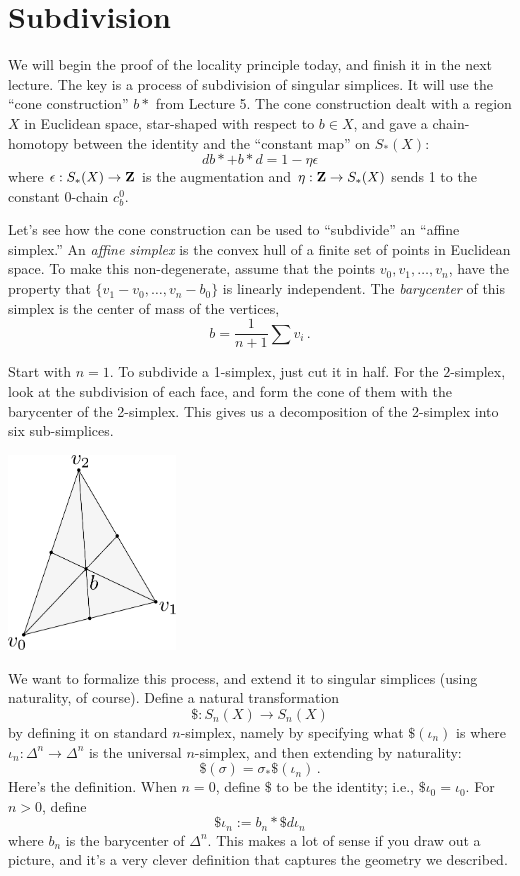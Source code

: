 \section{Subdivision}

We will begin the proof of the locality principle today, 
and finish it in the next lecture.
The key is a process of subdivision of singular simplices. It will use the 
``cone construction'' $b*$ from Lecture 5. The cone construction 
dealt with a region $X$ 
in Euclidean space, star-shaped with respect to $b\in X$, and gave a 
chain-homotopy between the identity and the ``constant map'' on $S_*(X)$:
\[
db*+b*d=1-\eta\epsilon
\]
where $\epsilon:S_*(X)\to\mathbf Z$ is the augmentation and $\eta:\mathbf Z\to S_*(X)$
sends 1 to the constant 0-chain $c_b^0$. 

Let's see how the cone construction can be used to ``subdivide'' an ``affine 
simplex.'' An {\em affine simplex} is the convex hull of a finite set of points in Euclidean space. To make this non-degenerate, assume that the points $v_0,v_1,\ldots,v_n$, have the property that $\{v_1-v_0,\ldots,v_n-b_0\}$ is linearly independent. 
The {\em barycenter} of this simplex is the center of mass of the vertices, 
\[
b=\frac{1}{n+1}\sum{v_i}\,.
\]

Start with $n=1$. To subdivide a 1-simplex, just cut it in half. 
For the $2$-simplex, look at the subdivision of each face, and form the cone
of them with the barycenter of the 2-simplex. This gives us a decomposition of
the 2-simplex into six sub-simplices. 

\begin{center}
\includegraphics[width=1.75in]{905/Figures/12-subdivision.pdf}
\end{center}

We want to formalize this process, and extend it to singular simplices (using
naturality, of course). Define a natural transformation 
\[
\$:S_n(X)\to S_n(X)
\]
 by defining it on standard $n$-simplex, namely by specifying what $\$(\iota_n)$ is where $\iota_n:\Delta^n\rightarrow\Delta^n$ is the universal $n$-simplex, and then extending by naturality:
\[
\$(\sigma)=\sigma_\ast\$(\iota_n)\,.
\]
Here's the definition. When $n=0$, define $\$$ to be the identity; i.e., $\$\iota_0=\iota_0$. For $n>0$, define 
\[
\$\iota_n:=b_n\ast\$ d\iota_n
\]
where $b_n$ is the barycenter of $\Delta^n$. This makes a lot of sense if you draw out a picture, and it's a very clever definition that captures the geometry we described. 

